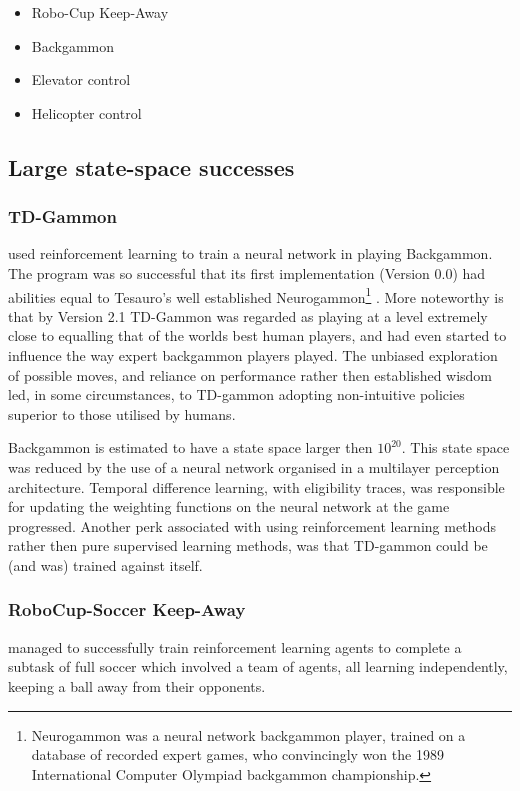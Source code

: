 \documentclass{rucsthesis}
\begin{document}
\begin{itemize}
\item{Robo-Cup Keep-Away \citep{keepaway}}
\item{Backgammon \citep{tdgammon}}
\item{Elevator control \citep{elevator}}
\item{Helicopter control}
\end{itemize}

\subsection{Large state-space successes}

\subsubsection{TD-Gammon}

 \cite{tdgammon} used reinforcement learning to train a neural network in playing Backgammon. The program was so successful that its first implementation (Version 0.0) had abilities equal to Tesauro's well established Neurogammon\footnote{Neurogammon was a neural network backgammon player, trained on a database of recorded expert games, who convincingly won the 1989 International Computer Olympiad backgammon championship.} \citep{tdgammon}.  More noteworthy is that by Version 2.1 TD-Gammon was regarded as playing at a level extremely close to equalling that of the worlds best human players, and had even started to influence the way expert backgammon players played\citep{tdgammon}. The unbiased exploration of possible moves, and reliance on performance rather then established wisdom led, in some circumstances, to TD-gammon adopting non-intuitive policies superior to those utilised by humans\citep{tdgammon}.

Backgammon is estimated to have a state space larger then $10^{20}$. This state space was reduced by the use of a neural network organised in a multilayer perception architecture. Temporal difference learning, with eligibility traces, was responsible for updating the weighting functions on the neural network at the game progressed. Another perk associated with using reinforcement learning methods rather then pure supervised learning methods, was that TD-gammon could be (and was) trained against itself\citep{tdgammon}.

\subsubsection{RoboCup-Soccer Keep-Away}
\cite{keepaway} managed to successfully train reinforcement learning agents to complete a subtask of full soccer which involved a team of agents, all learning independently, keeping a ball away from their opponents. 
\end{document}
